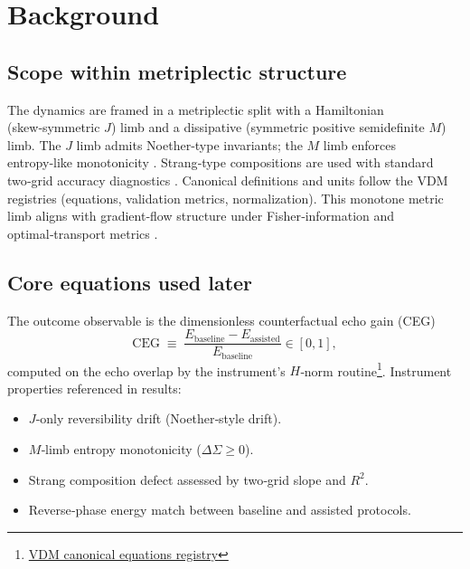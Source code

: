 \documentclass{article}
\newcommand{\CEG}{\mathrm{CEG}}
\begin{document}
\section{Background}
\subsection*{Scope within metriplectic structure}
The dynamics are framed in a metriplectic split with a Hamiltonian (skew‑symmetric $J$) limb and a dissipative (symmetric positive semidefinite $M$) limb. The $J$ limb admits Noether‑type invariants; the $M$ limb enforces entropy‑like monotonicity \citep{Morrison1986,OttingerGrmela1997I,GrmelaOttinger1997II}. Strang‑type compositions are used with standard two‑grid accuracy diagnostics \citep{Strang1968}. Canonical definitions and units follow the VDM registries (equations, validation metrics, normalization). This monotone metric limb aligns with gradient‑flow structure under Fisher‑information and optimal‑transport metrics \citep{OTFisherComputations}.

\subsection*{Core equations used later}
The outcome observable is the dimensionless counterfactual echo gain (CEG)
\begin{equation}
  \CEG
  \;\equiv\;
  \frac{E_{\mathrm{baseline}} - E_{\mathrm{assisted}}}{E_{\mathrm{baseline}}}
  \in [0,1],
\end{equation}
computed on the echo overlap by the instrument's $H$‑norm routine\footnote{\href{https://github.com/justinlietz93/Prometheus_VDM/blob/nexus/Derivation/z.CANONICAL_Equations/00_EQUATIONS.md}{VDM canonical equations registry}}. Instrument properties referenced in results:
\begin{itemize}[leftmargin=*]
  \item $J$‑only reversibility drift (Noether‑style drift).
  \item $M$‑limb entropy monotonicity ($\Delta \Sigma \ge 0$).
  \item Strang composition defect assessed by two‑grid slope and $R^2$.
  \item Reverse‑phase energy match between baseline and assisted protocols.
\end{itemize}
\end{document}
